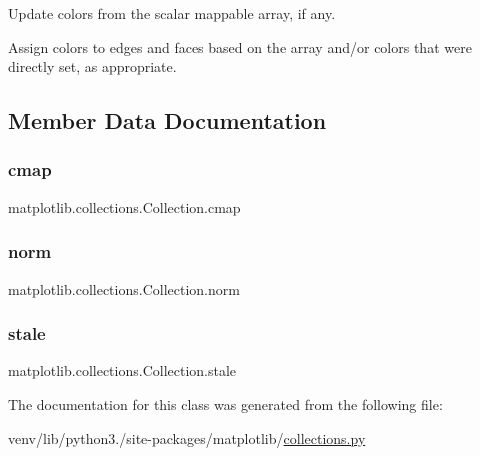 \begin{DoxyVerb}Update colors from the scalar mappable array, if any.

Assign colors to edges and faces based on the array and/or
colors that were directly set, as appropriate.
\end{DoxyVerb}
 

\subsection{Member Data Documentation}
\mbox{\label{classmatplotlib_1_1collections_1_1Collection_a7f884e899bdd39bd11811fe94920776b}} 
\subsubsection{\texorpdfstring{cmap}{cmap}}
{\footnotesize\ttfamily matplotlib.\+collections.\+Collection.\+cmap}

\mbox{\label{classmatplotlib_1_1collections_1_1Collection_a154db555ac4f8bb3d0d342ce30c2f7b1}} 
\subsubsection{\texorpdfstring{norm}{norm}}
{\footnotesize\ttfamily matplotlib.\+collections.\+Collection.\+norm}

\mbox{\label{classmatplotlib_1_1collections_1_1Collection_abb8317ac99bd1956e40828e682681c4d}} 
\subsubsection{\texorpdfstring{stale}{stale}}
{\footnotesize\ttfamily matplotlib.\+collections.\+Collection.\+stale}



The documentation for this class was generated from the following file\+:\begin{DoxyCompactItemize}
\item 
venv/lib/python3./site-\/packages/matplotlib/\hyperlink{collections_8py}{collections.\+py}\end{DoxyCompactItemize}
